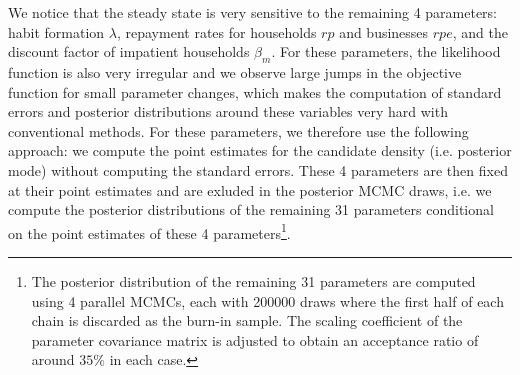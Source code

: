 \documentclass[12pt]{article}
\numberwithin{equation}{section}
\begin{document}
We notice that the steady state is very sensitive to the remaining 4 parameters: habit formation $\lambda$, repayment rates for households $rp$ and businesses $rpe$, and the discount factor of impatient households $\beta_m$. For these parameters, the likelihood function is also very irregular and we observe large jumps in the objective function for small parameter changes, which makes the computation of standard errors and posterior distributions around these variables very hard with conventional methods. For these parameters, we therefore use the following approach: we compute the point estimates for the candidate density (i.e. posterior mode) without computing the standard errors. These 4 parameters are then fixed at their point estimates and are exluded in the posterior MCMC draws, i.e. we compute the posterior distributions of the remaining 31 parameters conditional on the point estimates of these 4 parameters\footnote{The posterior distribution of the remaining 31 parameters are computed using 4 parallel MCMCs, each with 200000 draws where the first half of each chain is discarded as the burn-in sample. The scaling coefficient of the parameter covariance matrix is adjusted to obtain an acceptance ratio of around $35\%$ in each case.}.
\end{document}
